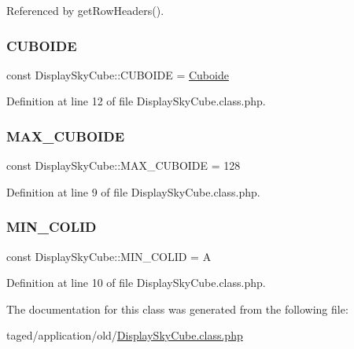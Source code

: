 Referenced by get\+Row\+Headers().

\mbox{\label{class_display_sky_cube_a734a94c1878145102276c4d36e528363}} 
\subsubsection{\texorpdfstring{C\+U\+B\+O\+I\+DE}{CUBOIDE}}
{\footnotesize\ttfamily const Display\+Sky\+Cube\+::\+C\+U\+B\+O\+I\+DE = \textquotesingle{}\hyperlink{class_cuboide}{Cuboide}\textquotesingle{}}



Definition at line 12 of file Display\+Sky\+Cube.\+class.\+php.

\mbox{\label{class_display_sky_cube_abf2787de3d21e313161ba0fc36d45978}} 
\subsubsection{\texorpdfstring{M\+A\+X\+\_\+\+C\+U\+B\+O\+I\+DE}{MAX\_CUBOIDE}}
{\footnotesize\ttfamily const Display\+Sky\+Cube\+::\+M\+A\+X\+\_\+\+C\+U\+B\+O\+I\+DE = 128}



Definition at line 9 of file Display\+Sky\+Cube.\+class.\+php.

\mbox{\label{class_display_sky_cube_a2c4385973578fcb1349d9615d8e7eb9d}} 
\subsubsection{\texorpdfstring{M\+I\+N\+\_\+\+C\+O\+L\+ID}{MIN\_COLID}}
{\footnotesize\ttfamily const Display\+Sky\+Cube\+::\+M\+I\+N\+\_\+\+C\+O\+L\+ID = \textquotesingle{}A\textquotesingle{}}



Definition at line 10 of file Display\+Sky\+Cube.\+class.\+php.



The documentation for this class was generated from the following file\+:\begin{DoxyCompactItemize}
\item 
taged/application/old/\hyperlink{_display_sky_cube_8class_8php}{Display\+Sky\+Cube.\+class.\+php}\end{DoxyCompactItemize}
